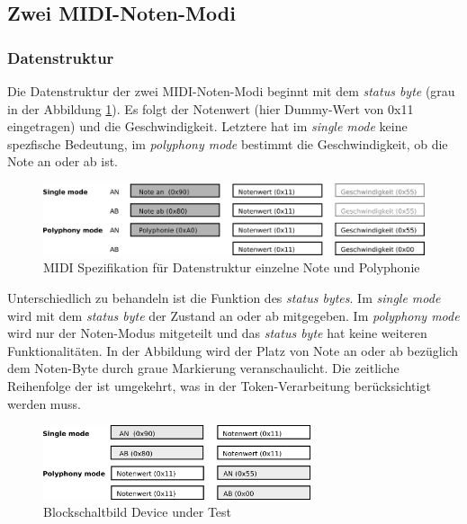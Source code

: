 \subsection{Zwei MIDI-Noten-Modi}\label{note_modes}

\subsubsection{Datenstruktur}

Die Datenstruktur der zwei MIDI-Noten-Modi beginnt mit dem \textit{status byte} (grau in der Abbildung \ref{fig.testbench_single_Mode}). Es folgt der Notenwert (hier Dummy-Wert von 0x11 eingetragen) und die Geschwindigkeit. Letztere hat im \textit{single mode} keine spezfische Bedeutung, im \textit{polyphony mode} bestimmt die Geschwindigkeit, ob die Note an oder ab ist.

\begin{figure}[H]
	\includegraphics[width=1\textwidth]{images/midi_interface/MIDI_Spezifikation.png}
	\caption{MIDI Spezifikation für Datenstruktur einzelne Note und Polyphonie}
	\label{fig.testbench_single_Mode}
\end{figure}

Unterschiedlich zu behandeln ist die Funktion des \textit{status bytes}. Im \textit{single mode} wird mit dem \textit{status byte} der Zustand an oder ab mitgegeben. Im \textit{polyphony mode} wird nur der Noten-Modus mitgeteilt und das \textit{status byte} hat keine weiteren Funktionalitäten. In der Abbildung wird der Platz von Note an oder ab bezüglich dem Noten-Byte durch graue Markierung veranschaulicht. Die zeitliche Reihenfolge der ist umgekehrt, was in der Token-Verarbeitung berücksichtigt werden muss.

\begin{figure}[H]
	\includegraphics[width=0.7\textwidth]{images/midi_interface/MIDI_Spezifikation_Datenfolge.png}
	\caption{Blockschaltbild Device under Test}
	\label{fig.testbench_polypphon_mode}
\end{figure}

